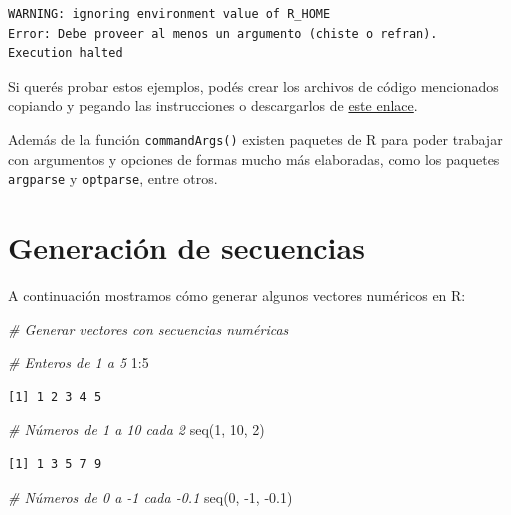 \documentclass[
]{book}
\newenvironment{Shaded}{\begin{snugshade}}{\end{snugshade}}
\newcommand{\CommentTok}[1]{\textcolor[rgb]{0.56,0.35,0.01}{\textit{#1}}}
\newcommand{\DecValTok}[1]{\textcolor[rgb]{0.00,0.00,0.81}{#1}}
\newcommand{\FloatTok}[1]{\textcolor[rgb]{0.00,0.00,0.81}{#1}}
\newcommand{\FunctionTok}[1]{\textcolor[rgb]{0.00,0.00,0.00}{#1}}
\newcommand{\NormalTok}[1]{#1}
\newcommand{\SpecialCharTok}[1]{\textcolor[rgb]{0.00,0.00,0.00}{#1}}
\begin{document}
\begin{verbatim}
WARNING: ignoring environment value of R_HOME
Error: Debe proveer al menos un argumento (chiste o refran).
Execution halted
\end{verbatim}

Si querés probar estos ejemplos, podés crear los archivos de código mencionados copiando y pegando las instrucciones o descargarlos de \href{https://github.com/mpru/introprog/tree/master/archivos}{este enlace}.

Además de la función \texttt{commandArgs()} existen paquetes de R para poder trabajar con argumentos y opciones de formas mucho más elaboradas, como los paquetes \texttt{argparse} y \texttt{optparse}, entre otros.

\hypertarget{generaciuxf3n-de-secuencias}{%
\section{Generación de secuencias}\label{generaciuxf3n-de-secuencias}}

A continuación mostramos cómo generar algunos vectores numéricos en R:

\begin{Shaded}
\begin{Highlighting}[]
\CommentTok{\# Generar vectores con secuencias numéricas}

\CommentTok{\# Enteros de 1 a 5}
\DecValTok{1}\SpecialCharTok{:}\DecValTok{5}
\end{Highlighting}
\end{Shaded}

\begin{verbatim}
[1] 1 2 3 4 5
\end{verbatim}

\begin{Shaded}
\begin{Highlighting}[]
\CommentTok{\# Números de 1 a 10 cada 2}
\FunctionTok{seq}\NormalTok{(}\DecValTok{1}\NormalTok{, }\DecValTok{10}\NormalTok{, }\DecValTok{2}\NormalTok{)}
\end{Highlighting}
\end{Shaded}

\begin{verbatim}
[1] 1 3 5 7 9
\end{verbatim}

\begin{Shaded}
\begin{Highlighting}[]
\CommentTok{\# Números de 0 a {-}1 cada {-}0.1}
\FunctionTok{seq}\NormalTok{(}\DecValTok{0}\NormalTok{, }\SpecialCharTok{{-}}\DecValTok{1}\NormalTok{, }\SpecialCharTok{{-}}\FloatTok{0.1}\NormalTok{)}
\end{Highlighting}
\end{Shaded}
\end{document}
